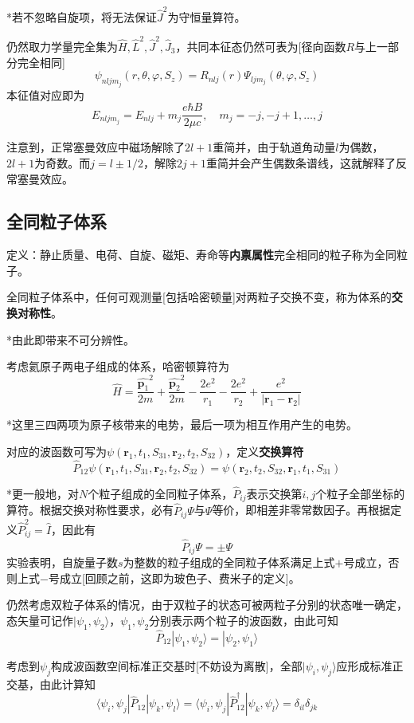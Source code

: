 \documentclass[a4paper,UTF8,fontset=windows]{ctexart}
\newcommand*{\ket}[1]{|#1\rangle}
\newcommand*{\blk}[3]{\langle#1|#2|#3\rangle}
\newcommand*{\br}{\mathbf{r}}
\newcommand*{\bp}{\mathbf{p}}
\begin{document}
*若不忽略自旋项，将无法保证$\hat{J}^2$为守恒量算符。

仍然取力学量完全集为$\hat{H},\hat{L}^2,\hat{J}^2,\hat{J}_3$，共同本征态仍然可表为[径向函数$R$与上一部分完全相同]
$$\psi_{nljm_j}(r,\theta,\varphi,S_z)=R_{nlj}(r)\Psi_{ljm_j}(\theta,\varphi,S_z)$$
本征值对应即为
$$E_{nljm_j}=E_{nlj}+m_j\frac{e\hbar B}{2\mu c},\quad m_j=-j,-j+1,\dots,j$$

注意到，正常塞曼效应中磁场解除了$2l+1$重简并，由于轨道角动量$l$为偶数，$2l+1$为奇数。而$j=l\pm1/2$，解除$2j+1$重简并会产生偶数条谱线，这就解释了反常塞曼效应。

\subsection{全同粒子体系}
定义：静止质量、电荷、自旋、磁矩、寿命等\textbf{内禀属性}完全相同的粒子称为全同粒子。

全同粒子体系中，任何可观测量[包括哈密顿量]对两粒子交换不变，称为体系的\textbf{交换对称性}。

*由此即带来不可分辨性。

考虑氦原子两电子组成的体系，哈密顿算符为
$$\hat{H}=\frac{\hat{\bp_1}^2}{2m}+\frac{\hat{\bp_2}^2}{2m}-\frac{2e^2}{r_1}-\frac{2e^2}{r_2}+\frac{e^2}{|\br_1-\br_2|}$$

*这里三四两项为原子核带来的电势，最后一项为相互作用产生的电势。

对应的波函数可写为$\psi(\br_1,t_1,S_{31},\br_2,t_2,S_{32})$，定义\textbf{交换算符}
$$\hat{P}_{12}\psi(\br_1,t_1,S_{31},\br_2,t_2,S_{32})=\psi(\br_2,t_2,S_{32},\br_1,t_1,S_{31})$$

*更一般地，对$N$个粒子组成的全同粒子体系，$\hat{P}_{ij}$表示交换第$i,j$个粒子全部坐标的算符。根据交换对称性要求，必有$\hat{P}_{ij}\Psi$与$\Psi$等价，即相差非零常数因子。再根据定义$\hat{P}_{ij}^2=\hat{I}$，因此有
$$\hat{P}_{ij}\Psi=\pm\Psi$$
实验表明，自旋量子数$s$为整数的粒子组成的全同粒子体系满足上式$+$号成立，否则上式$-$号成立[回顾之前，这即为玻色子、费米子的定义]。

仍然考虑双粒子体系的情况，由于双粒子的状态可被两粒子分别的状态唯一确定，态矢量可记作$\ket{\psi_1,\psi_2}$，$\psi_1,\psi_2$分别表示两个粒子的波函数，由此可知
$$\hat{P}_{12}\ket{\psi_1,\psi_2}=\ket{\psi_2,\psi_1}$$

考虑到$\psi_j$构成波函数空间标准正交基时[不妨设为离散]，全部$\ket{\psi_i,\psi_j}$应形成标准正交基，由此计算知
$$\blk{\psi_i,\psi_j}{\hat{P}_{12}}{\psi_k,\psi_l}=\blk{\psi_i,\psi_j}{\hat{P}_{12}^\dagger}{\psi_k,\psi_l}=\delta_{il}\delta_{jk}$$
\end{document}

